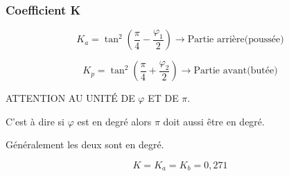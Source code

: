 \documentclass[12pt,a4paper]{report}
\begin{document}
	\subsubsection{Coefficient K}
	
	\begin{minipage}{.8\textwidth}
		\[ K_{a} = \tan^{2}\left( \dfrac{\pi}{4} - \dfrac{\varphi_{1}}{2} \right)\rightarrow\text{Partie arrière(poussée)} \]
		
		\[ K_{p} = \tan^{2}\left( \dfrac{\pi}{4} + \dfrac{\varphi_{2}}{2} \right)\rightarrow\text{Partie avant(butée)} \]
	\end{minipage}
	\begin{minipage}{.2\textwidth}
		\begin{figure}[H]
		\end{figure}
	\end{minipage}
	
	\begin{tcolorbox}[colback=red!20, colframe=red, title=Remarque]
		ATTENTION AU UNITÉ DE $\varphi$ ET DE $\pi$.
		
		C'est à dire si $\varphi$ est en degré alors $\pi$ doit aussi être en degré.
		
		Généralement les deux sont en degré.
	\end{tcolorbox}
	
	
	\[ K = K_{a} = K_{b} = 0,271 \]
	
	\vspace{\baselineskip}
	
	
	
\end{document}
